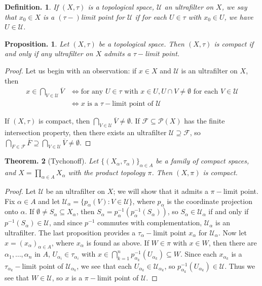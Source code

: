 \documentclass[11pt, a4paper]{memoir}
\theoremstyle{change}
\newtheorem{theorem}{Theorem.}[section]
\newtheorem{proposition}[theorem]{Proposition.}
\theoremstyle{plain}
\theoremstyle{nonumberplain}
\newtheorem{definition}{Definition.}
\newtheorem{proof}{Proof}
\numberwithin{equation}{section}
\begin{document}
\begin{definition}
    If $(X,\tau)$ is a topological space, $\mathcal{U}$ an ultrafilter on $X$, we say that $x_0\in X$ is a $(\tau-)$limit point for $\mathcal{U}$ if for each $U\in\tau$ with $x_0\in U$, we have $U\in\mathcal{U}$.
\end{definition}
\begin{proposition}
    Let $(X,\tau)$ be a topological space.
    Then $(X,\tau)$ is compact if and only if any ultrafilter on $X$ admits a $\tau-$limit point.
\end{proposition}
\begin{proof}
    Let us begin with an observation: if $x\in X$ and $\mathcal{U}$ is an ultrafilter on $X$, then
    \begin{align*}
        x\in\bigcap_{V\in\mathcal{U}}\overline{V} &\Leftrightarrow\text{for any }U\in\tau\text{ with }x\in U, U\cap V\neq\emptyset\text{ for each }V\in \mathcal{U}\\
                                                   &\Leftrightarrow x\text{ is a $\tau-$limit point of }\mathcal{U}
    \end{align*}
    
    If $(X,\tau)$ is compact, then $\bigcap_{V\in\mathcal{U}}\overline{V}\neq\emptyset$.
    If $\mathcal{F}\subseteq\mathcal{P}(X)$ has the finite intersection property, then there exists an ultrafilter $\mathcal{U}\supseteq\mathcal{F}$, so $\bigcap_{F\in\mathcal{F}}\overline{F}\supseteq\bigcap_{V\in\mathcal{U}}\overline{V}\neq\emptyset$.

\end{proof}
\begin{theorem}[Tychonoff]
    Let $\{(X_\alpha,\tau_\alpha)\}_{\alpha\in A}$ be a family of compact spaces, and $X=\prod_{\alpha \in A}X_\alpha$ with the product topology $\pi$.
    Then $(X,\pi)$ is compact.
\end{theorem}
\begin{proof}
    Let $\mathcal{U}$ be an ultrafilter on $X$; we will show that it admits a $\pi-$limit point.
    Fix $\alpha\in A$ and let $\mathcal{U}_\alpha=\{p_\alpha(V):V\in\mathcal{U}\}$, where $p_\alpha$ is the coordinate projection onto $\alpha$.
    If $\emptyset\neq S_\alpha\subseteq X_\alpha$, then $S_\alpha=p_\alpha^{-1}(p_\alpha^{-1}(S_\alpha))$, so $S_\alpha\in\mathcal{U}_\alpha$ if and only if $p^{-1}(S_\alpha)\in\mathcal{U}$, and since $p^{-1}$ commutes with complementation, $\mathcal{U}_\alpha$ is an ultrafilter.
    The last proposition provides a $\tau_\alpha-$limit point $x_\alpha$ for $\mathcal{U}_\alpha$.
    Now let $x=(x_\alpha)_{\alpha\in A}$, where $x_\alpha$ is found as above.
    If $W\in\pi$ with $x\in W$, then there are $\alpha_1,\ldots,\alpha_n$ in $A$, $U_{\alpha_i}\in\tau_{\alpha_i}$ with $x\in\bigcap_{k=1}^n p_{\alpha_k}^{-1}(U_{\alpha_k})\subseteq W$.
    Since each $x_{\alpha_k}$ is a $\tau_{\alpha_k}-$limit point of $\mathcal{U}_{\alpha_k}$, we see that each $U_{\alpha_k}\in\mathcal{U}_{\alpha_k}$, so $p_{\alpha_k}^{-1}(U_{\alpha_k})\in\mathcal{U}$.
    Thus we see that $W\in\mathcal{U}$, so $x$ is a $\pi-$limit point of $\mathcal{U}$.
\end{proof}
\end{document}
